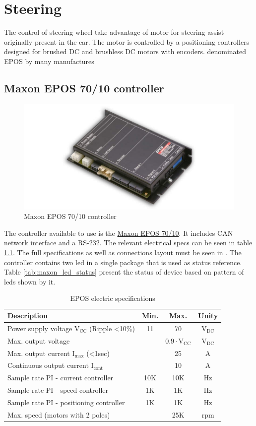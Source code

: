 \chapter{Steering}
The control of steering wheel take advantage of motor for steering assist originally present in the car. The motor is controlled by a positioning controllers designed for brushed DC and brushless DC motors with encoders. denominated \gls{EPOS} by many manufactures

\section{Maxon EPOS 70/10 controller}
\begin{figure}[h]
	\centering
	\includegraphics[width=0.5\linewidth]{figures/EPOS-70-10-10-A-11-70VDC-Detail.jpg}
	\caption{Maxon EPOS 70/10 controller}
	\label{fig:maxon_epos}
\end{figure}
The controller available to use is the \href{https://www.maxonmotor.com/maxon/view/product/control/Positionierung/300583}{Maxon EPOS 70/10}. It includes CAN network interface and a RS-232. The relevant electrical specs can be seen in table \ref{tab:epos_specs}. The full specifications as well as connections layout must be seen in \cite{epos_hardware}. The controller contains two led in a single package that is used as status reference. Table \ref{tab:maxon_led_status} present the status of device based on pattern of leds shown by it.

\begin{table}[hb]
	\centering
	\begin{tabular}{lccc}
		\toprule
		\textbf{Description} & \textbf{Min.} & \textbf{Max.} & \textbf{Unity}\\
		\midrule
		Power supply voltage $\text{V}_\text{CC}$ (Ripple \textless 10\%) & 11 & 70 & $\text{V}_\text{DC}$\\
		Max. output voltage & & $0.9\cdot\text{V}_\text{CC}$ & $\text{V}_\text{DC}$\\
		Max. output current $\text{I}_\text{max}$ (\textless 1sec) &  & 25 & A\\
		Continuous output current $\text{I}_\text{cont}$ & & 10 & A\\
		Sample rate PI - current controller &10K & 10K & Hz\\ 
		Sample rate PI - speed controller  &1K & 1K & Hz\\ 
		Sample rate PI - positioning controller &1K & 1K & Hz\\
		Max. speed (motors with 2 poles) & & 25K & rpm\\
		\bottomrule
	\end{tabular}
    \caption{EPOS electric specifications}
    \label{tab:epos_specs}
\end{table}

